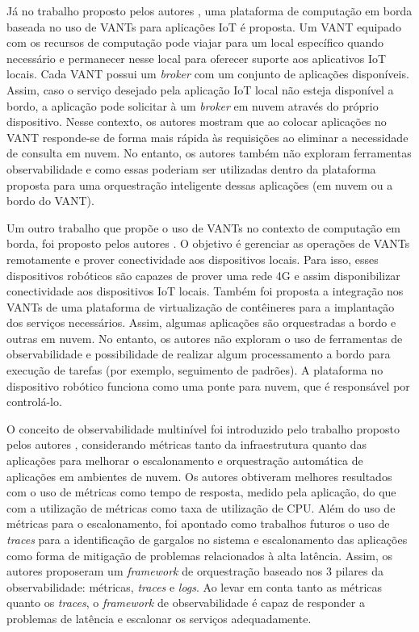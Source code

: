 Já no trabalho proposto pelos autores , uma plataforma de computação em borda baseada no uso de VANTs para aplicações IoT é proposta. Um VANT equipado com os recursos de computação pode viajar para um local específico quando necessário e permanecer nesse local para oferecer suporte aos aplicativos IoT locais. Cada VANT possui um \textit{broker} com um conjunto de aplicações disponíveis. Assim, caso o serviço desejado pela aplicação IoT local não esteja disponível a bordo, a aplicação pode solicitar à um \textit{broker} em nuvem através do próprio dispositivo. Nesse contexto, os autores mostram que ao colocar aplicações no VANT responde-se de forma mais rápida às requisições ao eliminar a necessidade de consulta em nuvem. No entanto, os autores também não exploram ferramentas  observabilidade e como essas poderiam ser utilizadas dentro da plataforma proposta para uma orquestração inteligente dessas aplicações (em nuvem ou a bordo do VANT).

Um outro trabalho que propõe o uso de VANTs no contexto de computação em borda, foi proposto pelos autores . O objetivo é gerenciar as operações de VANTs remotamente e prover conectividade aos dispositivos locais. Para isso, esses dispositivos robóticos são capazes de prover uma rede 4G e assim disponibilizar conectividade aos dispositivos IoT locais. Também foi proposta a integração nos VANTs de uma plataforma de virtualização de contêineres para a implantação dos serviços necessários. Assim, algumas aplicações são orquestradas a bordo e outras em nuvem. No entanto, os autores não exploram o uso de ferramentas de observabilidade e possibilidade de realizar algum processamento a bordo para execução de tarefas (por exemplo, seguimento de padrões). A plataforma no dispositivo robótico funciona como uma ponte para nuvem, que é responsável por controlá-lo.

O conceito de observabilidade multinível  foi introduzido pelo trabalho proposto pelos autores , considerando métricas tanto da infraestrutura quanto das aplicações para melhorar o escalonamento e orquestração automática de aplicações em ambientes de nuvem. Os autores obtiveram melhores resultados com o uso de métricas como tempo de resposta, medido pela aplicação, do que com a utilização de métricas como taxa de utilização de CPU. Além do uso de métricas para o escalonamento, foi apontado como trabalhos futuros   o uso de \textit{traces} para a identificação de gargalos no sistema e escalonamento das aplicações como forma de mitigação de problemas relacionados à alta latência. Assim, os autores  proposeram um \textit{framework} de orquestração baseado nos 3 pilares da observabilidade: métricas, \textit{traces} e \textit{logs}. Ao levar em conta tanto as métricas quanto os \textit{traces}, o \textit{framework} de observabilidade é capaz de responder a problemas de latência e escalonar os serviços adequadamente. 

